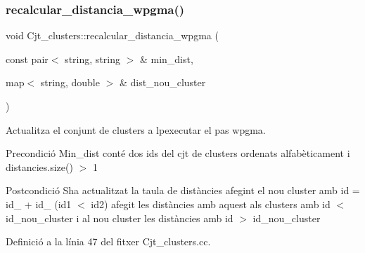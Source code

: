 \subsubsection{\texorpdfstring{recalcular\+\_\+distancia\+\_\+wpgma()}{recalcular\_distancia\_wpgma()}}
{\footnotesize\ttfamily void Cjt\+\_\+clusters\+::recalcular\+\_\+distancia\+\_\+wpgma (\begin{DoxyParamCaption}\item[{const pair$<$ string, string $>$ \&}]{min\+\_\+dist,  }\item[{map$<$ string, double $>$ \&}]{dist\+\_\+nou\+\_\+cluster }\end{DoxyParamCaption})\hspace{0.3cm}{\ttfamily [private]}}



Actualitza el conjunt de clusters a lpexecutar el pas wpgma. 

\begin{DoxyPrecond}{Precondició}
Min\+\_\+dist conté dos ids del cjt de clusters ordenats alfabèticament i distancies.\+size() $>$ 1 
\end{DoxyPrecond}
\begin{DoxyPostcond}{Postcondició}
S\textquotesingle{}ha actualitzat la taula de distàncies afegint el nou cluster amb id = id\+\_ + id\+\_ (id1 $<$ id2) afegit les distàncies amb aquest als clusters amb id $<$ id\+\_\+nou\+\_\+cluster i al nou cluster les distàncies amb id $>$ id\+\_\+nou\+\_\+cluster 
\end{DoxyPostcond}


Definició a la línia 47 del fitxer Cjt\+\_\+clusters.\+cc.


